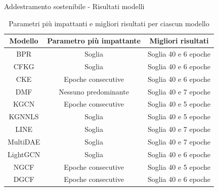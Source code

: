 \begin{frame}{Addestramento sostenibile - Risultati modelli}
\tiny
\begin{table}[H]
    \centering
    \begin{tabular}{|c|c|c|}
        \hline
        \textbf{Modello} & \textbf{Parametro più impattante} & \textbf{Migliori risultati} \\
        \hline
        BPR & Soglia & Soglia 40 e 6 epoche \\
        \hline
        CFKG & Soglia & Soglia 40 e 6 epoche \\
        \hline
        CKE & Epoche consecutive & Soglia 40 e 6 epoche \\
        \hline
        DMF & Nessuno predominante & Soglia 40 e 7 epoche \\
        \hline
        KGCN & Epoche consecutive & Soglia 40 e 5 epoche \\
        \hline
        KGNNLS & Soglia & Soglia 40 e 5 epoche \\
        \hline
        LINE & Soglia & Soglia 40 e 7 epoche \\
        \hline
        MultiDAE & Soglia & Soglia 40 e 7 epoche \\
        \hline
        LightGCN & Soglia & Soglia 40 e 6 epoche \\
        \hline
        NGCF & Epoche consecutive & Soglia 40 e 5 epoche \\
        \hline
        DGCF & Epoche consecutive & Soglia 40 e 6 epoche \\
        \hline
    \end{tabular}
    \caption{Parametri più impattanti e migliori risultati per ciascun modello}
\end{table}


\begin{table}[H]
    \centering
    \caption{Riassunto dei parametri dominanti per tipo di modello}
\end{table}

\end{frame}